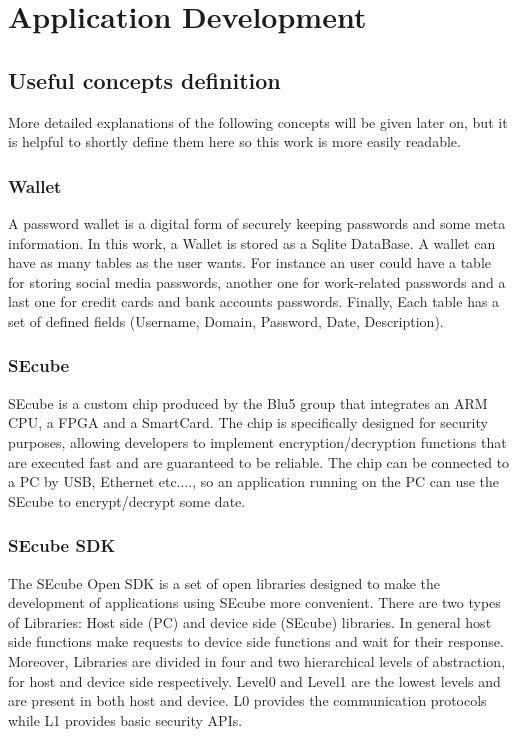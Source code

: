\chapter{Application Development}


\section{Useful concepts definition}

More detailed explanations of the following concepts will be given later on, but it is helpful to shortly define them here so this work is more easily readable.

\subsection{Wallet} A password wallet is a digital form of securely keeping passwords and some meta information. In this work, a Wallet is stored as a Sqlite DataBase. A wallet can have as many tables as the user wants. For instance an user could have a table for storing social media passwords, another one for work-related passwords and a last one for credit cards and bank accounts passwords. Finally, Each table has a set of defined fields (Username, Domain, Password, Date, Description).

\subsection{SEcube} SEcube is a custom chip produced by the Blu5 group \cite{Blu5} that integrates an ARM CPU, a FPGA and a SmartCard. The chip is specifically designed for security purposes, allowing developers to implement encryption/decryption functions that are executed fast and are guaranteed to be reliable. The chip can be connected to a PC by USB, Ethernet etc...., so an application running on the PC can use the SEcube to encrypt/decrypt some date.

\subsection{SEcube SDK} The SEcube Open SDK is a set of open libraries designed to make the development of applications using SEcube more convenient. There are two types of Libraries: Host side (PC) and device side (SEcube) libraries. In general host side functions make requests to device side functions and wait for their response. Moreover, Libraries are divided in four and two hierarchical levels of abstraction, for host and device side respectively. Level0 and Level1 are the lowest levels and are present in both host and device. L0 provides the communication protocols while L1 provides basic security APIs.

